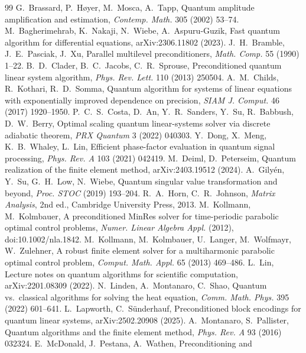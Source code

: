 \documentclass[11pt,a4paper]{article}
\theoremstyle{remark}
\begin{document}
\begin{thebibliography}{99}
 G.~Brassard, P.~H{\o}yer, M.~Mosca, A.~Tapp, Quantum amplitude
  amplification and estimation, \emph{Contemp. Math.} 305 (2002) 53--74.
 M.~Bagherimehrab, K.~Nakaji, N.~Wiebe, A.~Aspuru-Guzik, Fast
  quantum algorithm for differential equations, arXiv:2306.11802 (2023).
 J.~H.~Bramble, J.~E.~Pasciak, J.~Xu, Parallel multilevel
  preconditioners, \emph{Math. Comp.} 55 (1990) 1--22.
 B.~D.~Clader, B.~C.~Jacobs, C.~R.~Sprouse, Preconditioned quantum
  linear system algorithm, \emph{Phys. Rev. Lett.} 110 (2013) 250504.
 A.~M.~Childs, R.~Kothari, R.~D.~Somma, Quantum algorithm for
  systems of linear equations with exponentially improved dependence on
  precision, \emph{SIAM J. Comput.} 46 (2017) 1920--1950.
 P.~C.~S.~Costa, D.~An, Y.~R.~Sanders, Y.~Su, R.~Babbush,
  D.~W.~Berry, Optimal scaling quantum linear-systems solver via discrete
  adiabatic theorem, \emph{PRX Quantum} 3 (2022) 040303.
 Y.~Dong, X.~Meng, K.~B.~Whaley, L.~Lin, Efficient phase-factor
  evaluation in quantum signal processing, \emph{Phys. Rev. A} 103 (2021)
  042419.
 M.~Deiml, D.~Peterseim, Quantum realization of the finite element
  method, arXiv:2403.19512 (2024).
 A.~Gily\'en, Y.~Su, G.~H.~Low, N.~Wiebe, Quantum singular value
  transformation and beyond, \emph{Proc. STOC} (2019) 193--204.
 R.~A.~Horn, C.~R.~Johnson, \emph{Matrix Analysis}, 2nd ed.,
  Cambridge University Press, 2013.
 M.~Kollmann, M.~Kolmbauer, A preconditioned MinRes solver for
  time-periodic parabolic optimal control problems, \emph{Numer. Linear
  Algebra Appl.} (2012), doi:10.1002/nla.1842.
 M.~Kollmann, M.~Kolmbauer, U.~Langer, M.~Wolfmayr,
  W.~Zulehner, A robust finite element solver for a multiharmonic parabolic
  optimal control problem, \emph{Comput. Math. Appl.} 65 (2013) 469--486.
 L.~Lin, Lecture notes on quantum algorithms for scientific
  computation, arXiv:2201.08309 (2022).
 N.~Linden, A.~Montanaro, C.~Shao, Quantum vs.\ classical
  algorithms for solving the heat equation, \emph{Comm. Math. Phys.} 395
  (2022) 601--641.
 L.~Lapworth, C.~S\"underhauf, Preconditioned block encodings for
  quantum linear systems, arXiv:2502.20908 (2025).
 A.~Montanaro, S.~Pallister, Quantum algorithms and the finite
  element method, \emph{Phys. Rev. A} 93 (2016) 032324.
 E.~McDonald, J.~Pestana, A.~Wathen, Preconditioning and

\end{thebibliography}
\end{document}

